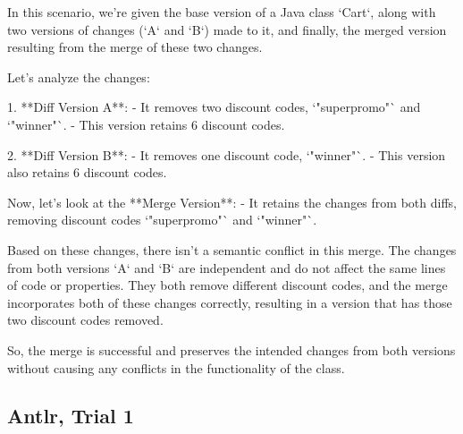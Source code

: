 \begin{response}
  In this scenario, we're given the base version of a Java class `Cart`, along with two versions of changes (`A` and `B`) made to it, and finally, the merged version resulting from the merge of these two changes.

  Let's analyze the changes:
  
  1. **Diff Version A**:
     - It removes two discount codes, `"superpromo"` and `"winner"`.
     - This version retains 6 discount codes.
  
  2. **Diff Version B**:
     - It removes one discount code, `"winner"`.
     - This version also retains 6 discount codes.
  
  Now, let's look at the **Merge Version**:
     - It retains the changes from both diffs, removing discount codes `"superpromo"` and `"winner"`.
  
  Based on these changes, there isn't a semantic conflict in this merge. The changes from both versions `A` and `B` are independent and do not affect the same lines of code or properties. They both remove different discount codes, and the merge incorporates both of these changes correctly, resulting in a version that has those two discount codes removed.
  
  So, the merge is successful and preserves the intended changes from both versions without causing any conflicts in the functionality of the class.
\end{response}

\subsection{Antlr, Trial 1}

